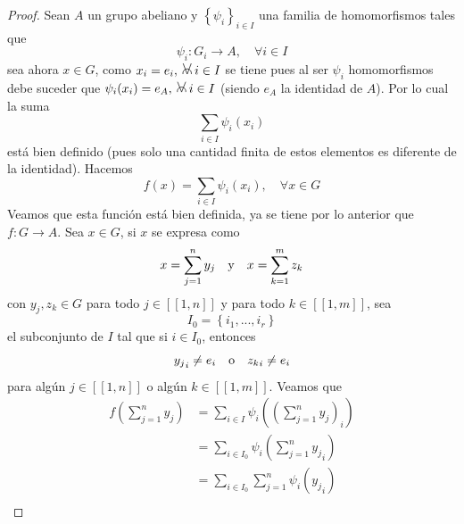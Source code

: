 \documentclass[12pt]{report}
\newcounter{it}
\theoremstyle{largebreak}
\newcommand\cf[3]{\ensuremath{#1:#2\rightarrow#3}}
\newcommand\natint[1]{\ensuremath{\left[\!\left[ #1\right]\!\right]}}
\newcommand{\afa}{\:
    \begin{tikzpicture}
        \draw [line width = 0.17 mm, black] (0,0) -- (-0.115,0.29);
        \draw [line width = 0.17 mm, black] (0,0) -- (0.115,0.29);
        \draw [line width = 0.17 mm, black] (-0.12,0) arc (190:-10:0.12cm);
    \end{tikzpicture}
    \:
}
\begin{document}
    \begin{proof}
        Sean $A$ un grupo abeliano y $\left\{\psi_i\right\}_{ i\in I}$ una familia de homomorfismos tales que
        \begin{equation*}
            \cf{\psi_i}{G_i}{A},\quad\forall i\in I
        \end{equation*}
        sea ahora $x\in G$, como $x_i=e_i,\afa i\in I$ se tiene pues al ser $\psi_i$ homomorfismos debe suceder que $\psi_i(x_i)=e_A,\afa i\in I$ (siendo $e_A$ la identidad de $A$). Por lo cual la suma
        \begin{equation*}
            \sum_{ i\in I}\psi_i(x_i)
        \end{equation*}
        está bien definido (pues solo una cantidad finita de estos elementos es diferente de la identidad). Hacemos
        \begin{equation*}
            f(x)=\sum_{ i\in I}\psi_i(x_i),\quad\forall x\in G
        \end{equation*}
        Veamos que esta función está bien definida, ya se tiene por lo anterior que $\cf{f}{G}{A}$. Sea $x\in G$, si $x$ se expresa como
        \begin{equation*}
            x=\sum_{ j=1}^n y_j \quad\textup{y}\quad x=\sum_{ k=1}^m z_k
        \end{equation*}
        con $y_j,z_k\in G$ para todo $j\in\natint{1,n}$ y para todo $k\in\natint{1,m}$, sea
        \begin{equation*}
            I_0=\left\{i_1,...,i_r \right\}
        \end{equation*}
        el subconjunto de $I$ tal que si $i\in I_0$, entonces
        \begin{equation*}
            {y_j}_i\neq e_i\quad\textup{o}\quad{ z_k}_i\neq e_i 
        \end{equation*}
        para algún $j\in\natint{1,n}$ o algún $k\in\natint{1,m}$. Veamos que
        \begin{equation*}
            \begin{split}
                f\left(\sum_{ j=1}^n y_j \right)&=\sum_{ i\in I}\psi_i\left(\left(\sum_{ j=1}^n y_j\right)_i\right)\\
                &=\sum_{ i\in I_0}\psi_i\left(\sum_{ j=1}^n {y_j}_i\right)\\
                &=\sum_{ i\in I_0}\sum_{ j=1}^n \psi_{ i}\left( {y_j}_{i}\right)\\
            \end{split}
        \end{equation*}

\end{proof}
\end{document}
